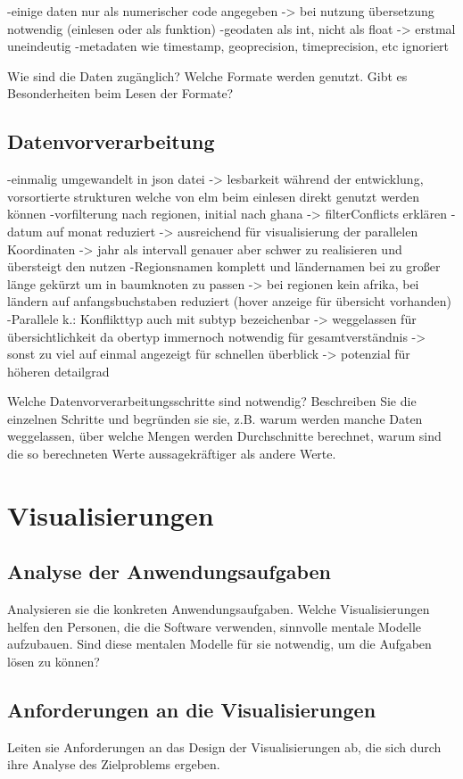 \documentclass[usegeometry=true]{scrartcl}
\begin{document}
-einige daten nur als numerischer code angegeben -> bei nutzung übersetzung notwendig (einlesen oder als funktion)
-geodaten als int, nicht als float -> erstmal uneindeutig
-metadaten wie timestamp, geoprecision, timeprecision, etc ignoriert

Wie sind die Daten zugänglich? Welche Formate werden genutzt. Gibt es Besonderheiten beim Lesen der Formate?
\subsection{Datenvorverarbeitung} \label{sec:datenvorverarbeitung}
-einmalig umgewandelt in json datei -> lesbarkeit während der entwicklung, vorsortierte strukturen welche von elm beim einlesen direkt genutzt werden können
-vorfilterung nach regionen, initial nach ghana -> filterConflicts erklären
-datum auf monat reduziert -> ausreichend für visualisierung der parallelen Koordinaten -> jahr als intervall genauer aber schwer zu realisieren und übersteigt den nutzen
-Regionsnamen komplett und ländernamen bei zu großer länge gekürzt um in baumknoten zu passen -> bei regionen kein afrika, bei ländern auf anfangsbuchstaben reduziert (hover anzeige für übersicht vorhanden)
-Parallele k.: Konflikttyp auch mit subtyp bezeichenbar -> weggelassen für übersichtlichkeit da obertyp immernoch notwendig für gesamtverständnis -> sonst zu viel auf einmal angezeigt für schnellen überblick -> potenzial für höheren detailgrad

Welche Datenvorverarbeitungsschritte sind notwendig? Beschreiben Sie die einzelnen Schritte und begründen sie sie, z.B. warum werden manche Daten weggelassen, über welche Mengen werden Durchschnitte berechnet, warum sind die so berechneten Werte aussagekräftiger als andere Werte. 

\section{Visualisierungen}
\subsection{Analyse der Anwendungsaufgaben}
Analysieren sie die konkreten Anwendungsaufgaben. Welche Visualisierungen helfen den Personen, die die Software verwenden, sinnvolle mentale Modelle aufzubauen. Sind diese mentalen Modelle für sie notwendig, um die Aufgaben lösen zu können?
\subsection{Anforderungen an die Visualisierungen}
Leiten sie Anforderungen an das Design der Visualisierungen ab, die sich durch ihre Analyse des Zielproblems ergeben.
\end{document}
